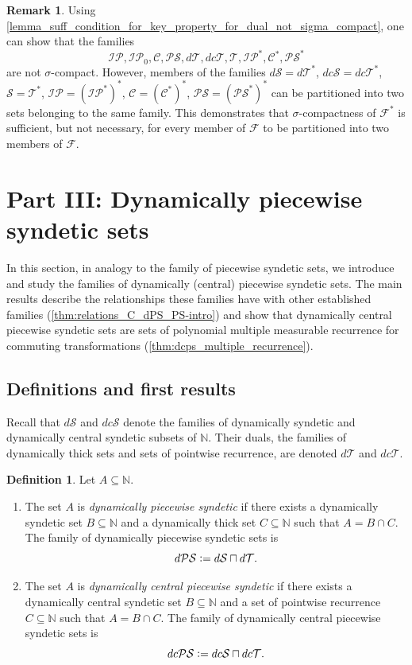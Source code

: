 \documentclass[letter,11pt]{article}
\theoremstyle{plain}
\theoremstyle{definition}
\newtheorem{definition}[theorem]{Definition}
\newtheorem{remark}[theorem]{Remark}
\theoremstyle{plain}
\theoremstyle{plain}
\numberwithin{equation}{section}
\newcommand{\N}{\mathbb{N}}
\newcommand{\defeq}{\vcentcolon=}
\newcommand{\syndetic}{\mathcal{S}}
\newcommand{\thick}{\mathcal{T}}
\newcommand{\dsyndetic}{d\mathcal{S}}
\newcommand{\dthick}{d\mathcal{T}}
\newcommand{\dcsyndetic}{dc\mathcal{S}}
\newcommand{\dcthick}{dc\mathcal{T}}
\newcommand{\PS}{\mathcal{PS}}
\newcommand{\dPS}{d\mathcal{PS}}
\newcommand{\dcPS}{dc\mathcal{PS}}
\newcommand{\central}{\mathcal{C}}
\newcommand{\IP}{\mathcal{IP}}
\newcommand{\classcap}{\sqcap}
\newcommand{\family}{\mathscr{F}}
\begin{document}
\begin{remark}
Using \cref{lemma_suff_condition_for_key_property_for_dual_not_sigma_compact}, one can show that the families 
\[
    \IP, \IP_0, \central, \PS, \dthick, \dcthick, \thick, \IP^*, \central^*, \PS^*
\]
are not $\sigma$-compact. However, members of the families $\dsyndetic = \dthick^*$, $\dcsyndetic = \dcthick^*$, $\syndetic = \thick^*$, $\IP = (\IP^*)^*$, $\central = (\central^*)^*$, $\PS = (\PS^*)^*$ can be partitioned into two sets belonging to the same family. This demonstrates that $\sigma$-compactness of $\family^*$ is sufficient, but not necessary, for every member of $\family$ to be partitioned into two members of $\family$.
\end{remark}



\section{Part III: Dynamically piecewise syndetic sets}
\label{sec_dps_sets}

In this section, in analogy to the family of piecewise syndetic sets, we introduce and study the families of dynamically (central) piecewise syndetic sets. The main results describe the relationships these families have with other established families (\cref{thm:relations_C_dPS_PS-intro}) and show that dynamically central piecewise syndetic sets are sets of polynomial multiple measurable recurrence for commuting transformations (\cref{thm:dcps_multiple_recurrence}).


\subsection{Definitions and first results}
\label{sec_dcps_def_and_first_results}

Recall that $\dsyndetic$ and $\dcsyndetic$ denote the families of dynamically syndetic and dynamically central syndetic subsets of $\N$.  Their duals, the families of dynamically thick sets and sets of pointwise recurrence, are denoted $\dthick$ and $\dcthick$.

\begin{definition}
    Let $A \subseteq \N$.
    \begin{enumerate}
        \item The set $A$ is \emph{dynamically piecewise syndetic} if there exists a dynamically syndetic set $B \subseteq \N$ and a dynamically thick set $C \subseteq \N$ such that $A = B \cap C$.  The family of dynamically piecewise syndetic sets is
        \[\dPS \defeq \dsyndetic \classcap \dthick.\]

        \item The set $A$ is \emph{dynamically central piecewise syndetic} if there exists a dynamically central syndetic set $B \subseteq \N$ and a set of pointwise recurrence $C \subseteq \N$ such that $A = B \cap C$.  The family of dynamically central piecewise syndetic sets is
        \[\dcPS \defeq \dcsyndetic \classcap \dcthick.\]
    \end{enumerate} 
\end{definition}
\end{document}
